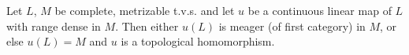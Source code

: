 Let $L$, $M$ be complete, metrizable t.v.s. and let $u$ be a continuous linear map of $L$ with range dense in $M$.
Then either $u(L)$ is meager (of first category) in $M$, or else $u(L) = M$ and $u$ is a topological homomorphism.
